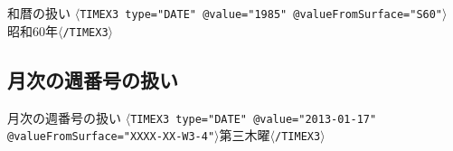 \documentclass[japanese]{jnlp_1.4}
\newcommand{\modified}[1]{}
\def\timexiii{}
\def\value{}
\def\valuefromsurface{}
\begin{document}
{\addtolength{\linewidth}{-6zw}\setlength{\leftskip}{3zw}
\begin{itembox}[l]{和暦の扱い}
{\small
{\tt $\langle$TIMEX3 type="DATE" @value="1985" @valueFromSurface="S60"$\rangle$}
昭和60年{\tt$\langle$/TIMEX3$\rangle$} }
\end{itembox}
\par}

\modified{旧暦に対しては，\valuefromsurface において日付表現の表示の末尾に ''Q''
を付与し旧暦を表し，明示的に新暦の暦日が記述されている場合にのみ \value 相当に記述する．}

\modified{皇紀に対しては，\valuefromsurface において表示の最初に ''JY''を付与し皇紀を表し，\value 相当に西暦を記述する．
}

\modified{韓国語（韓国・北朝鮮），中国語（中国・台湾）なども同様の問題が起き
うるが，公開されている文書を見る限り \value 相当に西暦を記述することで対処している．}


\subsection{月次の週番号の扱い}

\modified{欧米地域では年単位の週番号を利用する傾向がある一方，東アジア地域では「第三木曜」
など月単位の週番号を利用する傾向がある．
このため，韓国より \timexiii に対して月単位の週番号を記述可能にする拡張が提案さ
れている．具体的には以下のように\valuefromsurface の日相当部分に週番号を記述する．
\value にはカレンダーを参照することにより ISO-8601 の標準表記 {\tt XXXX-XX-XX}
形式の値をわりあてた．
 }

{\addtolength{\linewidth}{-6zw}\setlength{\leftskip}{3zw}
\begin{itembox}[l]{月次の週番号の扱い}
{\small
{\tt $\langle$TIMEX3 type="DATE" @value="2013-01-17" \\
@valueFromSurface="XXXX-XX-W3-4"$\rangle$}第三木曜{\tt$\langle$/TIMEX3$\rangle$} }
\end{itembox}
\par}


\subsection{\modified{その他日本語特有の表現}}


\modified{以下では日本語適応において問題となった雑多な事例について紹介する．基本
的に\valuefromsurface において日本語に限定した形式で正規化を行い，\value 相当
は正規表現などを用いて正規化を行う．}
\end{document}
